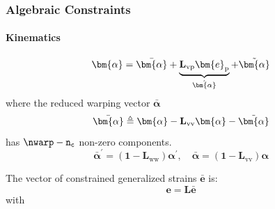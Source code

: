 \subsubsection{Algebraic Constraints}

\paragraph{Kinematics}

\begin{equation}
\bm{\alpha} = \bar{\bm{\alpha}} + \underbrace{\mathbf{L}_{\rm vp}\bm{e}_{\rm p}}_{\hat{\bm{\alpha}}}
    +\tilde{\bm{\alpha}}
\end{equation}
where the reduced warping vector \(\bar{\bm{\alpha}}\)
$$
\bar{\bm{\alpha}} \triangleq \bm{\alpha} - \mathbf{L}_{\rm vv} \bm{\alpha} - \tilde{\bm{\alpha}}
$$
has \(\nwarp - \mathtt{n_c}\) non-zero components.
\[
\bar{\bm{\alpha}}^{\prime}=\left(\mathbf{1}-\mathbf{L}_{\mathrm{ww}}\right) \bm{\alpha}^{\prime}, 
\quad
\bar{\bm{\alpha}}=\left(\mathbf{1}-\mathbf{L}_{\mathrm{vv}}\right) \bm{\alpha}
\]


The vector of constrained generalized strains \(\bar{\bm{e}}\) is:
\[
{\bm{e}} = \mathbf{L}\bar{\bm{e}}
\]
with

